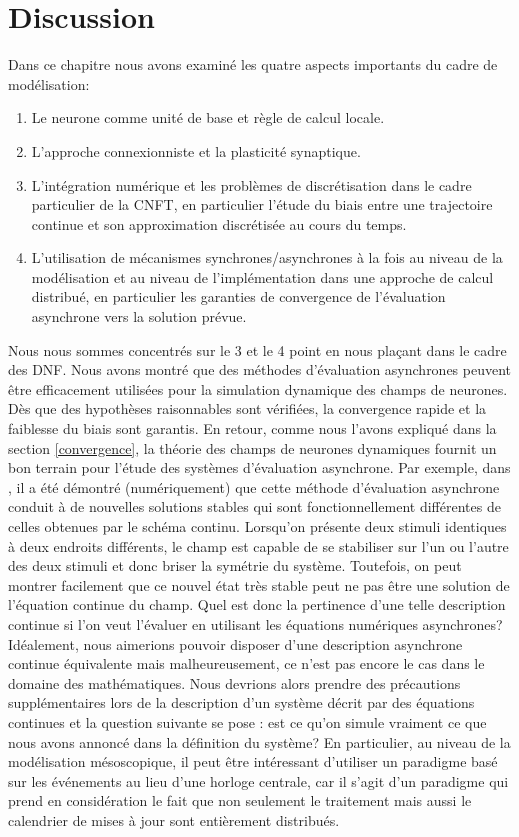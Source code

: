 \section{Discussion}


Dans ce chapitre nous avons examiné les quatre aspects importants du cadre de modélisation:
\begin{enumerate}
\item Le neurone comme unité de base et règle de calcul locale.
\item L'approche connexionniste et la plasticité synaptique.
\item L'intégration numérique et les problèmes de discrétisation dans le cadre particulier de la CNFT, en particulier l'étude du biais entre une trajectoire continue et son approximation discrétisée au cours du temps.
\item L'utilisation de mécanismes synchrones/asynchrones à la fois au niveau de la modélisation et au niveau de l'implémentation dans une approche de calcul distribué, en particulier les garanties de convergence de l'évaluation asynchrone vers la solution prévue.\\
\end{enumerate}

Nous nous sommes concentrés sur le 3{\ieme} et le 4{\ieme} point en nous plaçant dans le cadre des DNF. Nous avons montré que des méthodes d'évaluation asynchrones peuvent être efficacement utilisées pour la simulation dynamique des champs de neurones. Dès que des hypothèses raisonnables sont vérifiées, la convergence rapide et la faiblesse du biais sont garantis. En retour, comme nous l'avons expliqué dans la section \ref{convergence}, la théorie des champs de neurones dynamiques fournit un bon terrain pour l'étude des systèmes d'évaluation asynchrone. Par exemple, dans \cite {Rougier:2006}, il a été démontré (numériquement) que cette méthode d'évaluation asynchrone conduit à de nouvelles solutions stables qui sont fonctionnellement différentes de celles obtenues par le schéma continu. Lorsqu'on présente deux stimuli identiques à deux endroits différents, le champ est capable de se stabiliser sur l'un ou l'autre des deux stimuli et donc briser la symétrie du système. Toutefois, on peut montrer facilement que ce nouvel état très stable peut ne pas être une solution de l'équation continue du champ. Quel est donc la pertinence d'une telle description continue si l'on veut l'évaluer en utilisant les équations numériques asynchrones? Idéalement, nous aimerions pouvoir disposer d'une description asynchrone continue équivalente mais malheureusement, ce n'est pas encore le cas dans le domaine des mathématiques. Nous devrions alors prendre des précautions supplémentaires lors de la description d'un système décrit par des équations continues et la question suivante se pose : est ce qu'on simule vraiment ce que nous avons annoncé dans la définition du système? En particulier, au niveau de la modélisation mésoscopique, il peut être intéressant d'utiliser un paradigme basé sur les événements au lieu d'une horloge centrale, car il s'agit d'un paradigme qui prend en considération le fait que non seulement le traitement mais aussi le calendrier de mises à jour sont entièrement distribués. \\


